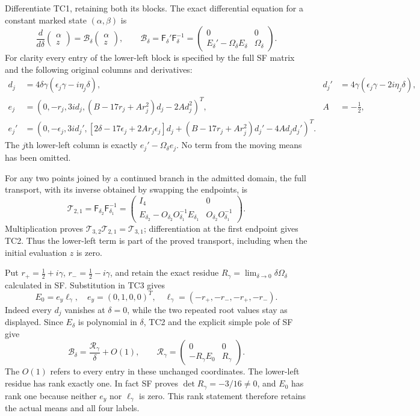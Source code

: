\documentclass[11pt]{article}
\begin{document}
Differentiate TC1, retaining both its blocks. The exact differential
equation for a constant marked state $(\alpha,\beta)$ is
\[
 \frac{d}{d\delta}\begin{pmatrix}\alpha\\z\end{pmatrix}
 =\mathcal B_\delta\begin{pmatrix}\alpha\\z\end{pmatrix},\qquad
 \mathcal B_\delta=\mathsf F_\delta'\mathsf F_\delta^{-1}
 =\begin{pmatrix}0&0\\
 E_\delta'-\Omega_\delta E_\delta&\Omega_\delta\end{pmatrix}.
 \tag{TC2}
\]
For clarity every entry of the lower-left block is specified by the
full SF matrix and the following original columns and derivatives:
\[
 \begin{aligned}
 d_j&=4\delta\gamma(\epsilon_j\gamma-i\eta_j\delta),&
 d_j'&=4\gamma(\epsilon_j\gamma-2i\eta_j\delta),\\
 e_j&=(0,-r_j,3id_j,
       (B-17r_j+Ar_j^2)d_j-2Ad_j^2)^T,& A&=-\tfrac12,\\
 e_j'&=(0,-\epsilon_j,3id_j',
 [2\delta-17\epsilon_j+2Ar_j\epsilon_j]d_j
 +(B-17r_j+Ar_j^2)d_j'-4Ad_jd_j')^T.
 \end{aligned} \tag{TC3}
\]
The $j$th lower-left column is exactly $e_j'-\Omega_\delta e_j$.
No term from the moving means has been omitted.

For any two points joined by a continued branch in the admitted
domain, the full transport, with its inverse obtained by swapping
the endpoints, is
\[
 \mathcal T_{2,1}=\mathsf F_{\delta_2}\mathsf F_{\delta_1}^{-1}
 =\begin{pmatrix}I_4&0\\
 E_{\delta_2}-O_{\delta_2}O_{\delta_1}^{-1}E_{\delta_1}&
 O_{\delta_2}O_{\delta_1}^{-1}\end{pmatrix}.
 \tag{TC4}
\]
Multiplication proves $\mathcal T_{3,2}\mathcal T_{2,1}
=\mathcal T_{3,1}$; differentiation at the first endpoint gives TC2.
Thus the lower-left term is part of the proved transport, including
when the initial evaluation $z$ is zero.

Put $r_+=\tfrac12+i\gamma$, $r_-=\tfrac12-i\gamma$, and retain
the exact residue $R_\gamma=\lim_{\delta\to0}\delta\Omega_\delta$
calculated in SF. Substitution in TC3 gives
\[
 E_0=e_y\ell_\gamma,\quad e_y=(0,1,0,0)^T,\quad
 \ell_\gamma=(-r_+,-r_-,-r_+,-r_-).
 \tag{TC5}
\]
Indeed every $d_j$ vanishes at $\delta=0$, while the two repeated
root values stay as displayed. Since $E_\delta$ is polynomial in
$\delta$, TC2 and the explicit simple pole of SF give
\[
 \mathcal B_\delta=\frac{\mathcal R_\gamma}{\delta}+O(1),\qquad
 \mathcal R_\gamma=
 \begin{pmatrix}0&0\\-R_\gamma E_0&R_\gamma\end{pmatrix}.
 \tag{TC6}
\]
The $O(1)$ refers to every entry in these unchanged coordinates.
The lower-left residue has rank exactly one. In fact SF proves
$\det R_\gamma=-3/16\ne0$, and $E_0$ has rank one because neither
$e_y$ nor $\ell_\gamma$ is zero. This rank statement therefore
retains the actual means and all four labels.
\end{document}
